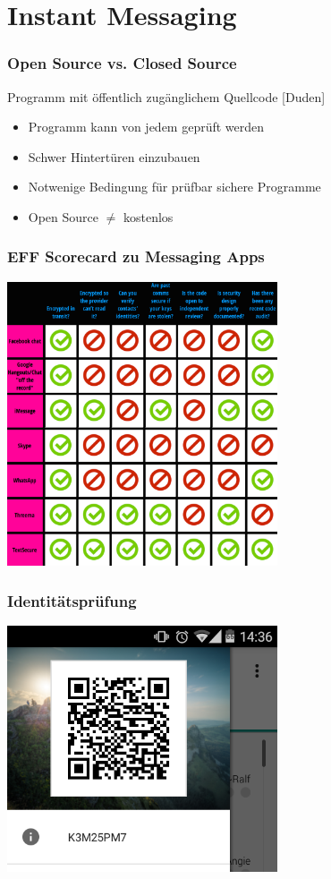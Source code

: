 \section{Instant Messaging}


\begin{frame}
  \frametitle{Open Source vs. Closed Source}
  \begin{definition}
   Programm mit öffentlich zugänglichem Quellcode \hfill \tiny [Duden]
  \end{definition}

  \begin{itemize}
   \item Programm kann von jedem geprüft werden
   \item Schwer Hintertüren einzubauen
   \item Notwenige Bedingung für prüfbar sichere Programme
   \item Open Source $\neq$ kostenlos
  \end{itemize}

\end{frame}


\begin{frame}
  \frametitle{EFF Scorecard zu Messaging Apps}
  \center
  \includegraphics[width=0.6\textwidth]{figures/eff_scorecard.png}
\end{frame}

\begin{frame}
  \frametitle{Identitätsprüfung}
  \center
  \includegraphics[width=0.6\textwidth]{figures/Threema_ID.png}
\end{frame}
